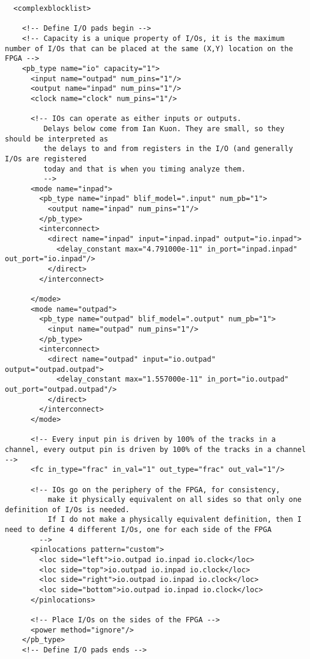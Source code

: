 \begin{lstlisting}
  <complexblocklist>

    <!-- Define I/O pads begin -->
    <!-- Capacity is a unique property of I/Os, it is the maximum number of I/Os that can be placed at the same (X,Y) location on the FPGA -->
    <pb_type name="io" capacity="1">
      <input name="outpad" num_pins="1"/>
      <output name="inpad" num_pins="1"/>
      <clock name="clock" num_pins="1"/>

      <!-- IOs can operate as either inputs or outputs.
	     Delays below come from Ian Kuon. They are small, so they should be interpreted as
	     the delays to and from registers in the I/O (and generally I/Os are registered 
	     today and that is when you timing analyze them.
	     -->
      <mode name="inpad">
        <pb_type name="inpad" blif_model=".input" num_pb="1">
          <output name="inpad" num_pins="1"/>
        </pb_type>
        <interconnect>
          <direct name="inpad" input="inpad.inpad" output="io.inpad">
            <delay_constant max="4.791000e-11" in_port="inpad.inpad" out_port="io.inpad"/>
          </direct>
        </interconnect>

      </mode>
      <mode name="outpad">
        <pb_type name="outpad" blif_model=".output" num_pb="1">
          <input name="outpad" num_pins="1"/>
        </pb_type>
        <interconnect>
          <direct name="outpad" input="io.outpad" output="outpad.outpad">
            <delay_constant max="1.557000e-11" in_port="io.outpad" out_port="outpad.outpad"/>
          </direct>
        </interconnect>
      </mode>

      <!-- Every input pin is driven by 100% of the tracks in a channel, every output pin is driven by 100% of the tracks in a channel -->
      <fc in_type="frac" in_val="1" out_type="frac" out_val="1"/>

      <!-- IOs go on the periphery of the FPGA, for consistency, 
          make it physically equivalent on all sides so that only one definition of I/Os is needed.
          If I do not make a physically equivalent definition, then I need to define 4 different I/Os, one for each side of the FPGA
        -->
      <pinlocations pattern="custom">
        <loc side="left">io.outpad io.inpad io.clock</loc>
        <loc side="top">io.outpad io.inpad io.clock</loc>
        <loc side="right">io.outpad io.inpad io.clock</loc>
        <loc side="bottom">io.outpad io.inpad io.clock</loc>
      </pinlocations>

      <!-- Place I/Os on the sides of the FPGA -->
      <power method="ignore"/>			
    </pb_type>
    <!-- Define I/O pads ends -->


\end{lstlisting}
